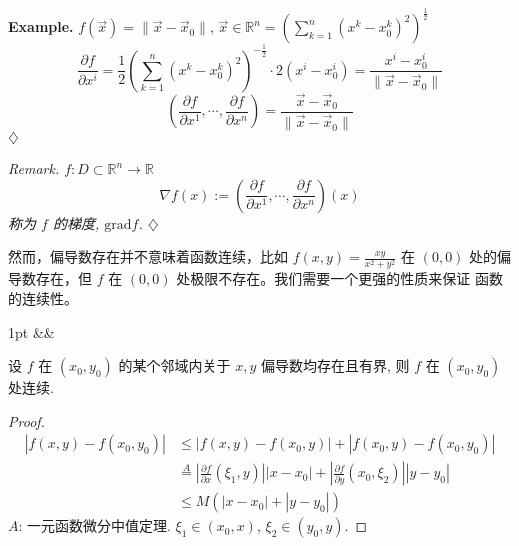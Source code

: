 \documentclass[a4paper]{article}
\newcommand{\R}{\mathbb{R}}
\newenvironment{formal}[1][]{%
\def\FrameCommand{%
\hspace{1pt}%
{\color{formalline}\vrule width 2pt}%
{\color{formalshade}\vrule width 4pt}%
\colorbox{formalshade}%
}%
\MakeFramed{\advance\hsize-\width\FrameRestore}%
\noindent
\hspace{-4.55pt}%
\begin{adjustwidth}{}{1pt}%
\setlength{\parindent}{0pt}%
\vspace{3pt}%
\ifx&#1&\else %
\textbf{#1}\par
\vspace{1pt}%
\fi }{%
\vspace{2pt}%
\end{adjustwidth}\endMakeFramed%
}
\newenvironment{remark}{%
\par
\smallskip
\noindent
\itshape Remark. }{%
\smallskip
\hfill$\diamondsuit$ \par}
\newenvironment{example}{%
\par
\smallskip
\noindent
\textbf{Example.} }{%
\smallskip
\hfill$\diamondsuit$ \par}
\begin{document}
    \begin{example}
        $f(\vec{x}) = \| \vec{x}- \vec{x}_{0}\|$,
        $\vec{x}\in \R^{n}= \left( \sum_{k=1}^{n}(x^{k}- x_{0}^{k})^{2}\right)^{\frac{1}{2}}$
        \[
            \frac{\partial f}{\partial x^{i}}= \frac{1}{2}\left( \sum_{k=1}^{n}(
            x^{k}- x_{0}^{k})^{2}\right)^{-\frac{1}{2}}\cdot 2(x^{i}- x_{0}^{i})=
            \frac{x^{i}- x_{0}^{i}}{\| \vec{x}- \vec{x}_{0}\|}
        \]
        \[
            \left( \frac{\partial f}{\partial x^{1}}, \cdots, \frac{\partial f}{\partial
            x^{n}}\right) = \frac{\vec{x}- \vec{x}_{0}}{\| \vec{x}- \vec{x}_{0}\|}
        \]
    \end{example}

    \begin{remark}
        $f: D \subset \R^{n}\to \R$
        \[
            \nabla f(x) := \left( \frac{\partial f}{\partial x^{1}}, \cdots, \frac{\partial
            f}{\partial x^{n}}\right)(x)
        \]
        称为 $f$ 的梯度, $\mathrm{grad}f$.
    \end{remark}

    然而，偏导数存在并不意味着函数连续，比如 $f(x, y) = \frac{xy}{x^{2}+ y^{2}}$
    在 $(0, 0)$ 处的偏导数存在，但 $f$ 在 $(0, 0)$ 处极限不存在。我们需要一个更强的性质来保证
    函数的连续性。

    \begin{formal}
        [偏导数有界 $\Rightarrow$ 连续] 设 $f$ 在 $(x_{0}, y_{0})$ 的某个邻域内关于
        $x, y$ 偏导数均存在且有界, 则 $f$ 在 $(x_{0}, y_{0})$ 处连续.
    \end{formal}

    \begin{proof}[Proof]
        \begin{align*}
            |f(x, y) - f(x_{0}, y_{0})| & \le |f(x, y) - f(x_{0}, y)| + |f(x_{0}, y) - f(x_{0}, y_{0})|                                                                                                  \\
                                        & \stackrel{A}{=}\left| \frac{\partial f}{\partial x}(\xi_{1}, y) \right| |x - x_{0}| + \left| \frac{\partial f}{\partial y}(x_{0}, \xi_{2}) \right| |y - y_{0}| \\
                                        & \le M \left( |x - x_{0}| + |y - y_{0}| \right)
        \end{align*}
        $A$: 一元函数微分中值定理. $\xi_{1}\in (x_{0}, x)$,
        $\xi_{2}\in (y_{0}, y)$.
    \end{proof}
\end{document}
